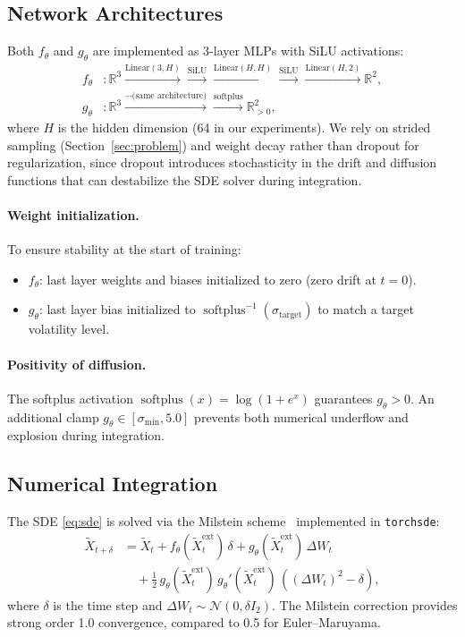 \documentclass[11pt, a4paper]{article}
\newcommand{\R}{\mathbb{R}}
\DeclareMathOperator{\softplus}{softplus}
\begin{document}
\subsection{Network Architectures}

Both $f_\theta$ and $g_\theta$ are implemented as 3-layer MLPs with SiLU activations:
\begin{align}
    f_\theta &: \R^3 \xrightarrow{\text{Linear}(3, H)} \xrightarrow{\text{SiLU}} \xrightarrow{\text{Linear}(H, H)} \xrightarrow{\text{SiLU}} \xrightarrow{\text{Linear}(H, 2)} \R^2, \\
    g_\theta &: \R^3 \xrightarrow{\cdots \text{(same architecture)}} \xrightarrow{\softplus} \R^2_{>0},
\end{align}
where $H$ is the hidden dimension (64 in our experiments). We rely on strided sampling (Section~\ref{sec:problem}) and weight decay rather than dropout for regularization, since dropout introduces stochasticity in the drift and diffusion functions that can destabilize the SDE solver during integration.

\paragraph{Weight initialization.}
To ensure stability at the start of training:
\begin{itemize}[nosep]
    \item $f_\theta$: last layer weights and biases initialized to zero (zero drift at $t=0$).
    \item $g_\theta$: last layer bias initialized to $\softplus^{-1}(\sigma_{\text{target}})$ to match a target volatility level.
\end{itemize}

\paragraph{Positivity of diffusion.}
The softplus activation $\softplus(x) = \log(1 + e^x)$ guarantees $g_\theta > 0$. An additional clamp $g_\theta \in [\sigma_{\min}, 5.0]$ prevents both numerical underflow and explosion during integration.

\subsection{Numerical Integration}

The SDE \eqref{eq:sde} is solved via the Milstein scheme~\citep{kloeden1992numerical} implemented in \texttt{torchsde}:
\begin{align}
    \tilde{X}_{t+\delta} &= \tilde{X}_t + f_\theta(\tilde{X}_t^{\text{ext}})\,\delta + g_\theta(\tilde{X}_t^{\text{ext}})\,\Delta W_t \nonumber \\
    &\quad + \tfrac{1}{2}\, g_\theta(\tilde{X}_t^{\text{ext}})\, g_\theta'(\tilde{X}_t^{\text{ext}})\,\left((\Delta W_t)^2 - \delta\right),
\end{align}
where $\delta$ is the time step and $\Delta W_t \sim \mathcal{N}(0, \delta I_2)$. The Milstein correction provides strong order 1.0 convergence, compared to 0.5 for Euler--Maruyama.
\end{document}
